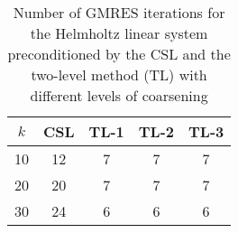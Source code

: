 \begin{table}[t]
\centering
\begin{tabular}{ccccc}
\hline
$k$ & CSL & TL-1 & TL-2 & TL-3 \\ \hline
10 & 12 & 7 & 7 & 7 \\
20 & 20 & 7 & 7 & 7 \\
30 & 24 & 6 & 6 & 6 \\
\hline
\end{tabular}
\caption{Number of GMRES iterations for the Helmholtz linear system preconditioned by the  CSL and the two-level method (TL) with different levels of coarsening}
\label{table:gmres_csl_vs_adef_coarse_eps_5}
\end{table}
